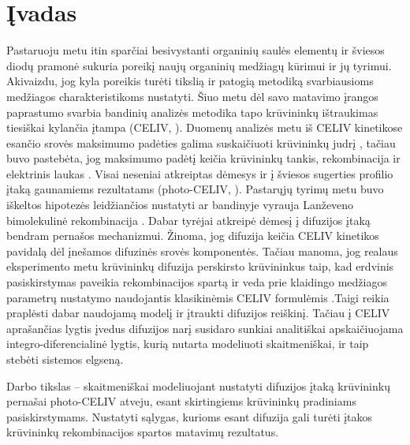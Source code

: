 
\section{Įvadas}

Pastaruoju metu itin sparčiai besivystanti organinių saulės elementų ir šviesos diodų pramonė sukuria poreikį naujų organinių medžiagų kūrimui ir jų tyrimui. Akivaizdu, jog kyla poreikis turėti tikslią ir patogią metodiką svarbiausioms medžiagos charakteristikoms nustatyti. Šiuo metu dėl savo matavimo įrangos paprastumo svarbia bandinių analizės metodika tapo krūvininkų ištraukimas tiesiškai kylančia įtampa (CELIV, \cite{juška:4946}). Duomenų analizės metu iš CELIV kinetikose esančio srovės maksimumo padėties galima suskaičiuoti krūvininkų judrį \cite{juška:4946}, tačiau buvo pastebėta, jog maksimumo padėtį keičia krūvininkų tankis,  rekombinacija ir elektrinis laukas \cite{bange:035209, lorrmann:113705}. Visai neseniai atkreiptas dėmesys ir į šviesos sugerties profilio įtaką gaunamiems rezultatams (photo-CELIV, \cite{juška:155202}). Pastarųjų tyrimų metu buvo iškeltos hipotezės leidžiančios nustatyti ar bandinyje vyrauja Lanževeno bimolekulinė rekombinacija \cite{juška:155202}. Dabar tyrėjai atkreipė dėmesį į difuzijos įtaką bendram pernašos mechanizmui.
Žinoma, jog difuzija keičia CELIV kinetikos pavidalą dėl įnešamos difuzinės srovės komponentės. Tačiau manoma, jog realaus eksperimento metu krūvininkų difuzija perskirsto krūvininkus taip, kad erdvinis pasiskirstymas paveikia rekombinacijos spartą ir veda prie klaidingo medžiagos parametrų nustatymo naudojantis klasikinėmis CELIV formulėmis  \cite{juška:4946}.Taigi reikia praplėsti dabar naudojamą modelį \cite{juška:155202} ir įtraukti difuzijos reiškinį.
Tačiau į CELIV aprašančias lygtis įvedus difuzijos narį susidaro sunkiai analitiškai apskaičiuojama integro-diferencialinė lygtis, kurią nutarta modeliuoti skaitmeniškai, ir taip stebėti sistemos elgseną.

Darbo tikslas -- skaitmeniškai modeliuojant nustatyti difuzijos įtaką krūvininkų pernašai photo-CELIV atveju, esant skirtingiems krūvininkų pradiniams pasiskirstymams. Nustatyti sąlygas, kurioms esant difuzija gali turėti įtakos krūvininkų rekombinacijos spartos matavimų rezultatus.